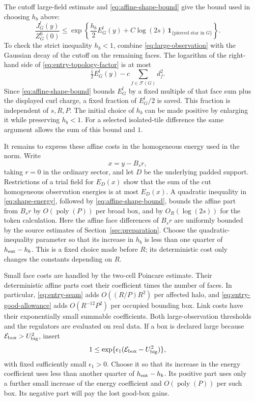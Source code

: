 The cutoff large-field estimate and \eqref{eq:affine-shape-bound}
give the bound used in choosing $h_b$ above:
\begin{equation}\label{eq:entry-broad-bound}
 \frac{J_G^l(y)}{Z_G^0(0)}
 \le \exp\left\{
       \frac{h_b}{2}E_G^l(y)
             +C\log(2s)\,\mathbf 1_{\{\text{pierced star in }G\}}
                    \right\}.
\end{equation}
To check the strict inequality $h_b<1$, combine
\eqref{eq:large-observation} with the Gaussian decay of the cutoff
on the remaining faces. The logarithm of the right-hand side of
\eqref{eq:entry-topology-factor} is at most
\[
              \tfrac12 E_G^l(y)-c\sum_{f\in\mathcal F(G)}d_f^2.
\]
Since \eqref{eq:affine-shape-bound} bounds $E_G^l$ by a fixed multiple
of that face sum plus the displayed curl charge, a fixed fraction
of $E_G^l/2$ is saved. This fraction is independent of $s,R,P$.
The initial choice of $h_b$ can be made positive by enlarging it
while preserving $h_b<1$. For a selected isolated-tile difference the same argument
allows the sum of this bound and $1$.

It remains to express these affine costs in the homogeneous energy
used in the norm. Write
\[
                         x=y-B_sr,
\]
taking $r=0$ in the ordinary sector, and let $D$ be the underlying
padded support. Restrictions of a trial field for $E_D(x)$ show that
the sum of the cut homogeneous observation energies is at most
$E_D(x)$. A quadratic inequality in \eqref{eq:shape-energy}, followed
by \eqref{eq:affine-shape-bound}, bounds the affine part from $B_sr$
by $O(\operatorname{poly}(P))$ per broad box, and by
$O_R(\log(2s))$ for the token calculation. Here the affine face
differences of $B_sr$ are uniformly bounded by the source estimates
of Section~\ref{sec:preparation}. Choose the quadratic-inequality
parameter so that its increase in $h_b$ is less than one quarter
of $h_{\rm ent}-h_b$. This is a fixed choice made before $R$;
its deterministic cost only changes the constants depending on $R$.

Small face costs are handled by the two-cell Poincare estimate. Their
deterministic affine parts cost their coefficient times the number
of faces. In particular, \eqref{eq:entry-seam} adds
$O((R/P)R^2)$ per affected halo, and
\eqref{eq:entry-good-allowance} adds $O(R^{-12}P^2)$ per occupied
bounding box. Link costs have their exponentially small summable
coefficients. Both large-observation thresholds and the regulators
are evaluated on real data. If a box is declared large because
$\mathcal E_{\rm box}>U_{\rm big}^2$, insert
\begin{equation}\label{eq:entry-bad-payment}
             1\le
       \exp\{\epsilon_1(\mathcal E_{\rm box}-U_{\rm big}^2)\},
\end{equation}
with fixed sufficiently small $\epsilon_1>0$. Choose it so that its
increase in the energy coefficient uses less than another quarter
of $h_{\rm ent}-h_b$. Its positive part
uses only a further small increase of the energy coefficient and
$O(\operatorname{poly}(P))$ per such box. Its negative part will
pay the lost good-box gains.

